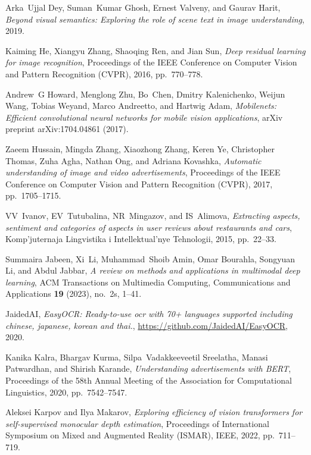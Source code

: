 \documentclass{zapiski}
\begin{document}
\begin{thebibliography}{10}
Arka~Ujjal Dey, Suman~Kumar Ghosh, Ernest Valveny, and Gaurav Harit,
  \emph{Beyond visual semantics: Exploring the role of scene text in image
  understanding}, 2019.

Kaiming He, Xiangyu Zhang, Shaoqing Ren, and Jian Sun, \emph{Deep residual
  learning for image recognition}, Proceedings of the IEEE Conference on
  Computer Vision and Pattern Recognition (CVPR), 2016, pp.~770--778.

Andrew~G Howard, Menglong Zhu, Bo~Chen, Dmitry Kalenichenko, Weijun Wang,
  Tobias Weyand, Marco Andreetto, and Hartwig Adam, \emph{Mobilenets: Efficient
  convolutional neural networks for mobile vision applications}, arXiv preprint
  arXiv:1704.04861 (2017).

Zaeem Hussain, Mingda Zhang, Xiaozhong Zhang, Keren Ye, Christopher Thomas,
  Zuha Agha, Nathan Ong, and Adriana Kovashka, \emph{Automatic understanding of
  image and video advertisements}, Proceedings of the IEEE Conference on
  Computer Vision and Pattern Recognition (CVPR), 2017, pp.~1705--1715.

VV~Ivanov, EV~Tutubalina, NR~Mingazov, and IS~Alimova, \emph{Extracting
  aspects, sentiment and categories of aspects in user reviews about
  restaurants and cars}, Komp'juternaja Lingvistika i Intellektual'nye
  Tehnologii, 2015, pp.~22--33.

Summaira Jabeen, Xi~Li, Muhammad~Shoib Amin, Omar Bourahla, Songyuan Li, and
  Abdul Jabbar, \emph{A review on methods and applications in multimodal deep
  learning}, ACM Transactions on Multimedia Computing, Communications and
  Applications \textbf{19} (2023), no.~2s, 1--41.

JaidedAI, \emph{{EasyOCR}: Ready-to-use ocr with 70+ languages supported
  including chinese, japanese, korean and thai.},
  \url{https://github.com/JaidedAI/EasyOCR}, 2020.

Kanika Kalra, Bhargav Kurma, Silpa~Vadakkeeveetil Sreelatha, Manasi Patwardhan,
  and Shirish Karande, \emph{Understanding advertisements with {BERT}},
  Proceedings of the 58th Annual Meeting of the Association for Computational
  Linguistics, 2020, pp.~7542--7547.

Aleksei Karpov and Ilya Makarov, \emph{Exploring efficiency of vision
  transformers for self-supervised monocular depth estimation}, Proceedings of
  International Symposium on Mixed and Augmented Reality (ISMAR), IEEE, 2022,
  pp.~711--719.


\end{thebibliography}
\end{document}
